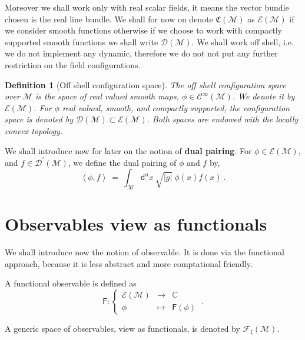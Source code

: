 \documentclass[10pt]{book}
\newcommand{\abs}[1]{\left|#1\right|}
\newcommand{\sm}[1]{\left\langle#1\right\rangle}
\let\int\int
\newcommand{\Ccal}{\mathcal{C}}
\newcommand{\Dcal}{\mathcal{D}}
\newcommand{\Ecal}{\mathcal{E}}
\newcommand{\Fcal}{\mathcal{F}}
\newcommand{\Mcal}{\mathcal{M}}
\newcommand{\Cbb}{\mathbb{C}}
\newcommand{\Crak}{\mathfrak{C}}
\newcommand{\Fsf}{\mathsf{F}}
\newcommand{\dsf}{\mathsf{d}}
\theoremstyle{break}
\newtheorem{definition}{Definition}
\begin{document}
\bigskip


Moreover  we shall work only with real scalar  fields, it means the vector bundle chosen is the real line bundle. We shall for now on denote $\Crak(\Mcal)$ as $\Ecal(\Mcal)$ if we consider smooth functions otherwise if we choose to work with compactly supported smooth functions we  shall write $\Dcal(\Mcal)$. We shall work off shell, i.e. we do not implement any dynamic, therefore we do not not put any further restriction on the field configurations.


\begin{definition}[Off shell configuration space]
The off shell configuration space over $\Mcal$ is the space of real valued smooth maps, $\phi \in \Ccal^\infty(\Mcal)$. We denote it by $\Ecal(\Mcal)$. For $\phi$ real valued, smooth, and compactly supported, the configuration space is denoted by $\Dcal(\Mcal) \subset \Ecal(\Mcal)$. Both spaces are endowed with the locally convex topology.
\end{definition}


We shall introduce now for later on the notion of \textbf{dual pairing}. For $\phi \in \mathcal{E}(\Mcal)$, and $f\in \mathcal{D}^{\prime}(\Mcal)$, we define the dual pairing of $\phi$ and $f$ by,
%
\begin{equation*}
\sm{\phi,f} \ = \ \int_{\Mcal} \dsf^n x \ \sqrt{\abs{g}} \ \phi(x) f(x) \ .
\end{equation*}


\section{Observables view as functionals}


We shall introduce now the notion of observable. It is done via the functional approach, because it is less abstract and more comptational friendly.


\bigskip

A functional observable is defined as 
%
\begin{equation*}
\Fsf : \left\{
\begin{array}{ccc}
\Ecal(\Mcal) & \to     & \Cbb \\
\phi  & \mapsto & \Fsf(\phi)
\end{array}
\right. \ . 
\end{equation*}

A generic space of observables, view as functionals, is denoted by $\Fcal_\sharp(\Mcal)$.
\end{document}
